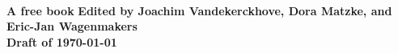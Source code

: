 \null\vspace{7cm}
{\huge\ttfamily\bfseries\noindent\thetitle}\\[8mm]
{\large\ttfamily\bfseries\noindent A free book}
\vfill
{\normalsize\ttfamily\bfseries\noindent 
	Edited by Joachim Vandekerckhove, Dora Matzke, 
	and Eric-Jan Wagenmakers\\[5mm]
	Draft of \today\hfill\version}
\vspace{1cm}
